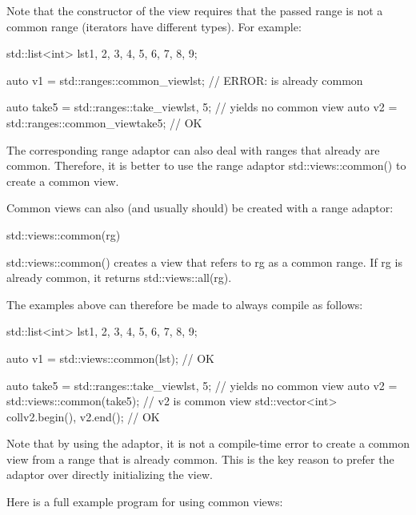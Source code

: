 Note that the constructor of the view requires that the passed range is not a common range (iterators have different types). For example:

\begin{cpp}
std::list<int> lst{1, 2, 3, 4, 5, 6, 7, 8, 9};

auto v1 = std::ranges::common_view{lst}; // ERROR: is already common

auto take5 = std::ranges::take_view{lst, 5}; // yields no common view
auto v2 = std::ranges::common_view{take5}; // OK
\end{cpp}

The corresponding range adaptor can also deal with ranges that already are common. Therefore, it is better to use the range adaptor std::views::common() to create a common view.


Common views can also (and usually should) be created with a range adaptor:

\begin{cpp}
std::views::common(rg)
\end{cpp}

std::views::common() creates a view that refers to rg as a common range. If rg is already common, it returns std::views::all(rg).

The examples above can therefore be made to always compile as follows:

\begin{cpp}
std::list<int> lst{1, 2, 3, 4, 5, 6, 7, 8, 9};

auto v1 = std::views::common(lst); // OK

auto take5 = std::ranges::take_view{lst, 5}; // yields no common view
auto v2 = std::views::common(take5); // v2 is common view
std::vector<int> coll{v2.begin(), v2.end()}; // OK
\end{cpp}

Note that by using the adaptor, it is not a compile-time error to create a common view from a range that is already common. This is the key reason to prefer the adaptor over directly initializing the view.

Here is a full example program for using common views:


